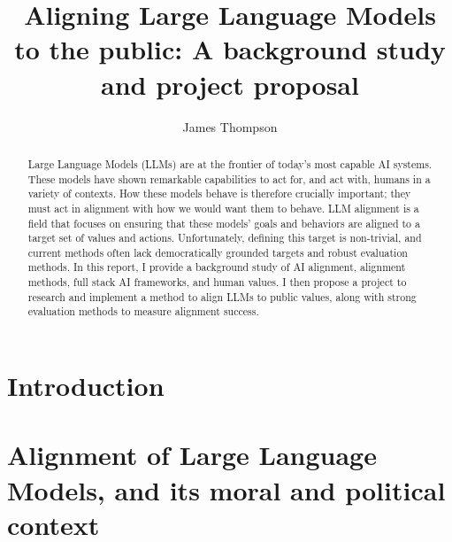 \documentclass[11pt, a4paper, twoside, openright]{report}
\title{Aligning Large Language Models to the public: A background study and project proposal}
\author{James Thompson}
\begin{document}
\frontmatter


\begin{abstract}
   Large Language Models (LLMs) are at the frontier of today's most capable AI systems. These models have shown remarkable capabilities to act for, and act with, humans in a variety of contexts. How these models behave is therefore crucially important; they must act in alignment with how we would want them to behave. LLM alignment is a field that focuses on ensuring that these models' goals and behaviors are aligned to a target set of values and actions. Unfortunately, defining this target is non-trivial, and current methods often lack democratically grounded targets and robust evaluation methods. In this report, I provide a background study of AI alignment, alignment methods, full stack AI frameworks, and human values. I then propose a project to research and implement a method to align LLMs to public values, along with strong evaluation methods to measure alignment success.
\end{abstract}


\maketitle

\tableofcontents



\mainmatter


\newpage

\chapter{Introduction}



\chapter{Alignment of Large Language Models, and its moral and political context}

\end{document}
